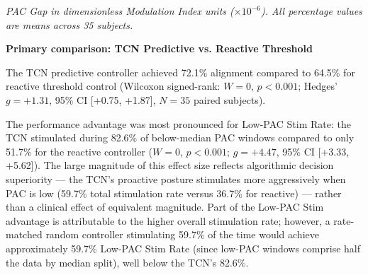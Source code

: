 \documentclass[11pt,letterpaper]{article}
\begin{document}
\begin{table}[htbp]
\centering
\caption{Controller comparison ($N = 35$ subjects, real EEG).}
\label{tab:controller_comparison}
\footnotesize
{}
\vspace{0.3em}
\par\small\textit{PAC Gap in dimensionless Modulation Index units ($\times 10^{-6}$). All percentage values are means across 35 subjects.}
\end{table}

\textbf{Primary comparison: TCN Predictive vs. Reactive Threshold}

The TCN predictive controller achieved 72.1\% alignment compared to 64.5\% for reactive threshold control (Wilcoxon signed-rank: $W = 0$, $p < 0.001$; Hedges' $g = +1.31$, 95\% CI [+0.75, +1.87], $N = 35$ paired subjects).

The performance advantage was most pronounced for Low-PAC Stim Rate: the TCN stimulated during 82.6\% of below-median PAC windows compared to only 51.7\% for the reactive controller ($W = 0$, $p < 0.001$; $g = +4.47$, 95\% CI [+3.33, +5.62]). The large magnitude of this effect size reflects algorithmic decision superiority --- the TCN's proactive posture stimulates more aggressively when PAC is low (59.7\% total stimulation rate versus 36.7\% for reactive) --- rather than a clinical effect of equivalent magnitude. Part of the Low-PAC Stim advantage is attributable to the higher overall stimulation rate; however, a rate-matched random controller stimulating 59.7\% of the time would achieve approximately 59.7\% Low-PAC Stim Rate (since low-PAC windows comprise half the data by median split), well below the TCN's 82.6\%.
\end{document}

